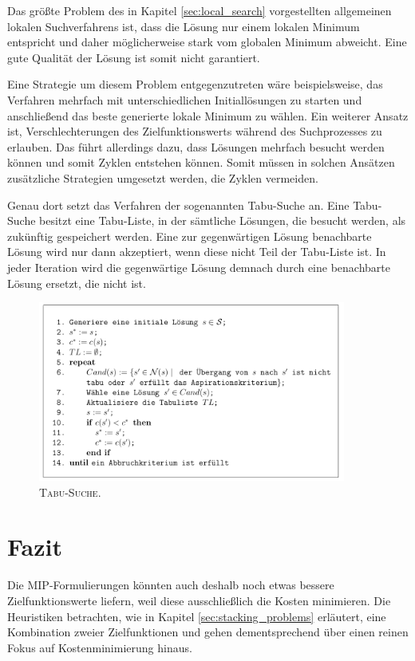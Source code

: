 Das größte Problem des in Kapitel \ref{sec:local_search} vorgestellten allgemeinen lokalen Suchverfahrens
ist, dass die Lösung nur einem lokalen Minimum entspricht und daher möglicherweise stark vom globalen
Minimum abweicht. Eine gute Qualität der Lösung ist somit nicht garantiert.

Eine Strategie um diesem Problem entgegenzutreten wäre beispielsweise, das Verfahren mehrfach mit unterschiedlichen
Initiallösungen zu starten und anschließend das beste generierte lokale Minimum zu wählen.
Ein weiterer Ansatz ist, Verschlechterungen des Zielfunktionswerts während des Suchprozesses zu erlauben.
Das führt allerdings dazu, dass Lösungen mehrfach besucht werden können und somit Zyklen entstehen können.
Somit müssen in solchen Ansätzen zusätzliche Strategien umgesetzt werden, die Zyklen vermeiden. \cite{Brucker2006}

Genau dort setzt das Verfahren der sogenannten Tabu-Suche an. Eine Tabu-Suche besitzt eine Tabu-Liste,
in der sämtliche Lösungen, die besucht werden, als zukünftig  gespeichert werden.
Eine zur gegenwärtigen Lösung benachbarte Lösung wird nur dann akzeptiert, wenn diese nicht Teil der Tabu-Liste ist.
In jeder Iteration wird die gegenwärtige Lösung demnach durch eine benachbarte Lösung ersetzt, die nicht  ist.

\begin{figure}[H]
\centering
\includegraphics[width=0.9\textwidth]{img/tabu_search_algo_placeholder.png}
\caption{\textsc{Tabu-Suche. \cite{Knust2017}}}
\label{fig:local_search_weakness}
\end{figure}

\pagebreak

\section{Fazit}
\label{sec:conclusion}

Die MIP-Formulierungen könnten auch deshalb noch etwas bessere Zielfunktionswerte liefern, weil
diese ausschließlich die Kosten minimieren.
Die Heuristiken betrachten, wie in Kapitel \ref{sec:stacking_problems} erläutert, eine Kombination zweier Zielfunktionen
und gehen dementsprechend über einen reinen Fokus auf Kostenminimierung hinaus.
